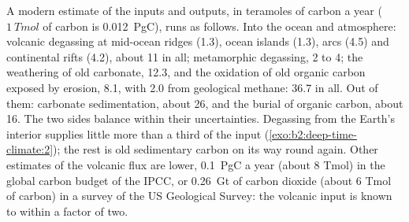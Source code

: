 A modern estimate of the inputs and outputs, in teramoles of carbon a year ($\qty{1}{Tmol}$ of
carbon is \qty{0.012}{PgC}), runs as follows. Into the ocean and atmosphere: volcanic degassing at
mid-ocean ridges (1.3), ocean islands (1.3), arcs (4.5) and continental rifts (4.2), about 11 in
all; metamorphic degassing, 2 to 4; the weathering of old carbonate, 12.3, and the oxidation of
old organic carbon exposed by erosion, 8.1, with 2.0 from geological methane: \num{36.7} in all.
Out of them: carbonate sedimentation, about 26, and the burial of organic carbon, about 16. The two
sides balance within their uncertainties. Degassing from the Earth's interior supplies little more than a
third of the input (\cref{exo:b2:deep-time-climate:2}); the rest is old sedimentary carbon on its
way round again. Other estimates of the volcanic flux are lower, \qty{0.1}{PgC} a year
(about 8 Tmol) in the global carbon budget of the IPCC, or \qty{0.26}{Gt} of carbon dioxide (about 6
Tmol of carbon) in a survey of the US Geological Survey: the volcanic input is known to within a
factor of two.

